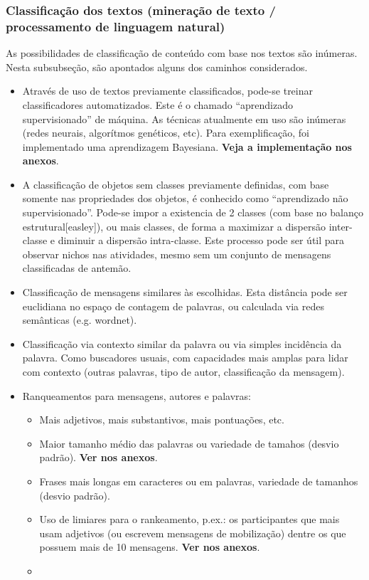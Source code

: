 \documentclass[12pt]{article}
\begin{document}
\subsubsection{Classificação dos textos (mineração de texto / processamento de linguagem natural)}
As possibilidades de classificação de conteúdo com base nos textos são inúmeras. Nesta subsubseção, são apontados alguns dos caminhos considerados.
\begin{itemize}
    \item Através de uso de textos previamente classificados, pode-se treinar classificadores automatizados. Este é o chamado “aprendizado supervisionado” de máquina. As técnicas atualmente em uso são inúmeras (redes neurais, algorítmos genéticos, etc). Para  exemplificação, foi implementado uma aprendizagem Bayesiana. {\bf Veja a implementação nos anexos}.
    \item A classificação de objetos sem classes previamente definidas, com base somente nas propriedades dos objetos, é conhecido como ``aprendizado não supervisionado''. Pode-se impor a existencia de 2 classes (com base no balanço estrutural[easley]), ou mais classes, de forma a maximizar a dispersão inter-classe e diminuir a dispersão intra-classe. Este processo pode ser útil para observar nichos nas atividades, mesmo sem um conjunto de mensagens classificadas de antemão.
    \item Classificação de mensagens similares às escolhidas. Esta distância pode ser euclidiana no espaço de contagem de palavras, ou calculada via redes semânticas (e.g. wordnet).
    \item Classificação via contexto similar da palavra ou via simples incidência da palavra. Como buscadores usuais, com capacidades mais amplas para lidar com contexto (outras palavras, tipo de autor, classificação da mensagem).
    \item Ranqueamentos para mensagens, autores e palavras:
\begin{itemize}
        \item Mais adjetivos, mais substantivos, mais pontuações, etc. 
        \item Maior tamanho médio das palavras ou variedade de tamahos (desvio padrão). {\bf Ver nos anexos}.
        \item Frases mais longas em caracteres ou em palavras, variedade de tamanhos (desvio padrão).
        \item Uso de limiares para o rankeamento, p.ex.: os participantes que mais usam adjetivos (ou escrevem mensagens de mobilização) dentre os que possuem mais de 10 mensagens. {\bf Ver nos anexos}.
        \item 
\end{itemize}
\end{itemize}
\end{document}
